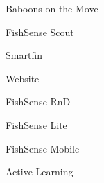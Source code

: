 \item Baboons on the Move
\item FishSense Scout
\item Smartfin
\item Website
\item FishSense RnD
\item FishSense Lite
\item FishSense Mobile
\item Active Learning
